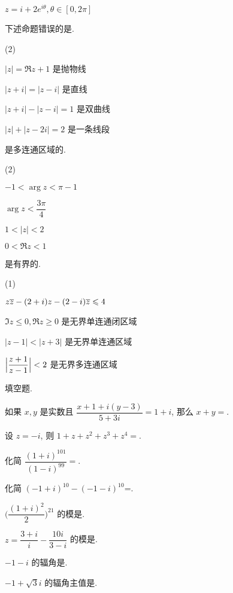 \begin{homework}
\begin{subex}
\begin{exchoice}
      \item $z=i+2e^{i\theta},\theta\in[0,2\pi]$
    \end{exchoice}
    \item 下述命题错误的是\fillbrace{}.
    \begin{exchoice}(2)
      \item $|z|=\Re z+1$ 是抛物线
      \item $|z+i|=|z-i|$ 是直线
      \item $|z+i|-|z-i|=1$ 是双曲线
      \item $|z|+|z-2i|=2$ 是一条线段
    \end{exchoice}
    \item \fillbrace{}是多连通区域的.
    \begin{exchoice}(2)
      \item $-1<\arg z<\pi-1$
      \item $\arg z<\dfrac{3\pi}4$
      \item $1<|z|<2$
      \item $0<\Re z<1$
    \end{exchoice}
    \item \fillbrace{}是有界的.
    \begin{exchoice}(1)
      \item $z\overline z-(2+i)z-(2-i)\overline z\leqslant 4$
      \item $\Im z\le0,\Re z\ge0$ 是无界单连通闭区域
      \item $|z-1|<|z+3|$ 是无界单连通区域
      \item $\Bigl|\dfrac{z+1}{z-1}\Bigr|<2$ 是无界多连通区域
    \end{exchoice}
  \end{subex}
  \item 填空题.
  \begin{subex}
    \item 如果 $x,y$ 是实数且 $\dfrac{x+1+i(y-3)}{5+3i}=1+i$, 那么 $x+y=$\fillblank{}.
    \item 设 $z=-i$, 则 $1+z+z^2+z^3+z^4=$\fillblank{}.
    \item 化简 $\dfrac{(1+i)^{101}}{(1-i)^{99}}=$\fillblank{}.
    \item 化简 $(-1+i)^{10}-(-1-i)^{10}$=\fillblank{}.
    \item $\biggl(\dfrac{(1+i)^2}2\biggr)^{21}$ 的模是\fillblank{}.
    \item $z=\dfrac{3+i}{i}-\dfrac{10i}{3-i}$ 的模是\fillblank{}.
    \item $-1-i$ 的辐角是\fillblank{}.
    \item $-1+\sqrt 3i$ 的辐角主值是\fillblank{}.

\end{subex}
\end{homework}

